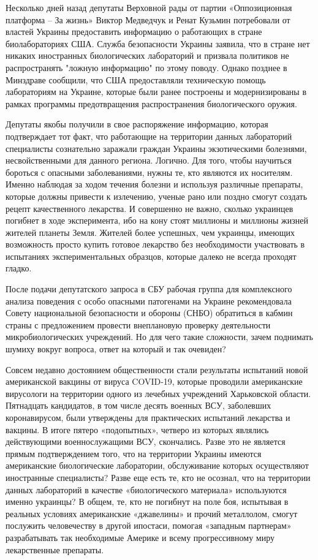 \documentclass[a4paper,11pt]{extreport}
\begin{document}
Несколько дней назад депутаты Верховной рады от партии «Оппозиционная платформа
– За жизнь» Виктор Медведчук и Ренат Кузьмин потребовали от властей Украины
предоставить информацию о работающих в стране биолабораториях США. Служба
безопасности Украины заявила, что в стране нет никаких иностранных
биологических лабораторий и призвала политиков не распространять "ложную
информацию" по этому поводу. Однако позднее в Минздраве сообщили, что США
предоставляли техническую помощь лабораториям на Украине, которые были ранее
построены и модернизированы в рамках программы предотвращения распространения
биологического оружия.

Депутаты якобы получили в свое распоряжение информацию, которая подтверждает
тот факт, что работающие на территории данных лабораторий специалисты
сознательно заражали граждан Украины экзотическими болезнями, несвойственными
для данного региона. Логично. Для того, чтобы научиться бороться с опасными
заболеваниями, нужны те, кто являются их носителям. Именно наблюдая за ходом
течения болезни и используя различные препараты, которые должны привести к
излечению, ученые рано или поздно смогут создать рецепт качественного
лекарства. И совершенно не важно, сколько украинцев погибнет в ходе
эксперимента, ибо на кону стоят миллионы и миллионы жизней жителей планеты
Земля. Жителей более успешных, чем украинцы, имеющих возможность просто купить
готовое лекарство без необходимости участвовать в испытаниях экспериментальных
образцов, которые далеко не всегда проходят гладко.

После подачи депутатского запроса в СБУ рабочая группа для комплексного анализа
поведения с особо опасными патогенами на Украине рекомендовала Совету
национальной безопасности и обороны (СНБО) обратиться в кабмин страны с
предложением провести внеплановую проверку деятельности микробиологических
учреждений. Но для чего такие сложности, зачем поднимать шумиху вокруг вопроса,
ответ на который и так очевиден?

Совсем недавно достоянием общественности стали результаты испытаний новой
американской вакцины от вируса COVID-19, которые проводили американские
вирусологи на территории одного из лечебных учреждений Харьковской области.
Пятнадцать кандидатов, в том числе десять военных ВСУ, заболевших
коронавирусом, были утверждены для практических испытаний лекарства и вакцины.
В итоге пятеро «подопытных», четверо из которых являлись действующими
военнослужащими ВСУ, скончались. Разве это не является прямым подтверждением
того, что на территории Украины имеются американские биологические лаборатории,
обслуживание которых осуществляют иностранные специалисты? Разве еще есть те,
кто не осознал, что на территории данных лабораторий в качестве «биологического
материала» используются именно украинцы? В общем, те, кто не погибнут на поле
боя, испытывая в реальных условиях американские «джавелины» и прочий
металлолом, смогут послужить человечеству в другой ипостаси, помогая «западным
партнерам» разрабатывать так необходимые Америке и всему прогрессивному миру
лекарственные препараты.
\end{document}
